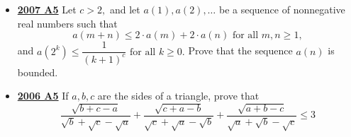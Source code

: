 \documentclass[11pt]{scrartcl}
\begin{document}
\begin{itemize}[leftmargin=*]
\[ a + b + c + d < \dfrac{b}{a} + \dfrac{c}{b} + \dfrac{d}{c} + \dfrac{a}{d}\] 
\item \href{https://artofproblemsolving.com/community/c6h214704p1187165}{\textbf{2007 A5}} Let $ c > 2,$ and let $ a(1), a(2), \dots$ be a sequence of nonnegative real numbers such that
\[ a(m + n) \leqslant 2 \cdot a(m) + 2 \cdot a(n) \text{ for all } m,n \geqslant  1,
\]
and $ a\left(2^k \right) \leqslant \dfrac {1}{(k + 1)^c} \text{ for all } k \geqslant  0.$ Prove that the sequence $ a(n)$ is bounded. 
\item \href{https://artofproblemsolving.com/community/c6h130812p741368}{\textbf{2006 A5}} 	If $a,b,c$ are the sides of a triangle, prove that
\[\frac{\sqrt{b+c-a}}{\sqrt{b}+\sqrt{c}-\sqrt{a}}+\frac{\sqrt{c+a-b}}{\sqrt{c}+\sqrt{a}-\sqrt{b}}+\frac{\sqrt{a+b-c}}{\sqrt{a}+\sqrt{b}-\sqrt{c}}\leqslant 3 \]
\end{itemize}


 
\newpage
\end{document}
